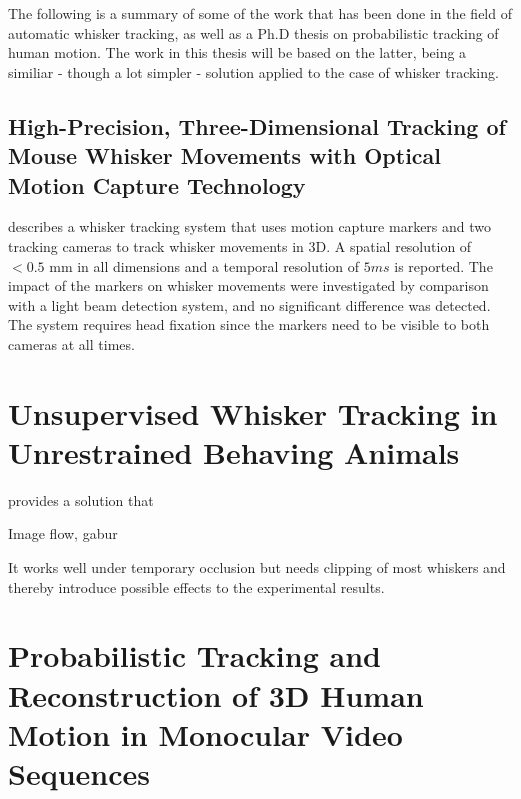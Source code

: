 The following is a summary of some of the work that has been done in
the field of automatic whisker tracking, as well as a Ph.D thesis on
probabilistic tracking of human motion. The work in this thesis will
be based on the latter, being a similiar - though a lot simpler -
solution applied to the case of whisker tracking.


\subsection{High-Precision, Three-Dimensional Tracking of Mouse
  Whisker Movements with Optical Motion Capture Technology}

\cite{BadExample1} describes a whisker tracking system that uses
motion capture markers and two tracking cameras to track whisker
movements in 3D. A spatial resolution of $<0.5$ mm in all dimensions
and a temporal resolution of $5 ms$ is reported. The impact of the
markers on whisker movements were investigated by comparison with a
light beam detection system, and no significant difference was
detected. The system requires head fixation since the markers need to
be visible to both cameras at all times.
        

\section{Unsupervised Whisker Tracking in Unrestrained Behaving
  Animals}

\cite{UnsupervisedTracking} provides a solution that


Image flow, gabur

It works well under temporary occlusion but needs clipping of most
whiskers and thereby introduce possible effects to the experimental
results.



        

\section{Probabilistic Tracking and Reconstruction of 3D Human Motion in Monocular Video Sequences\cite{Hedvig}}
    


